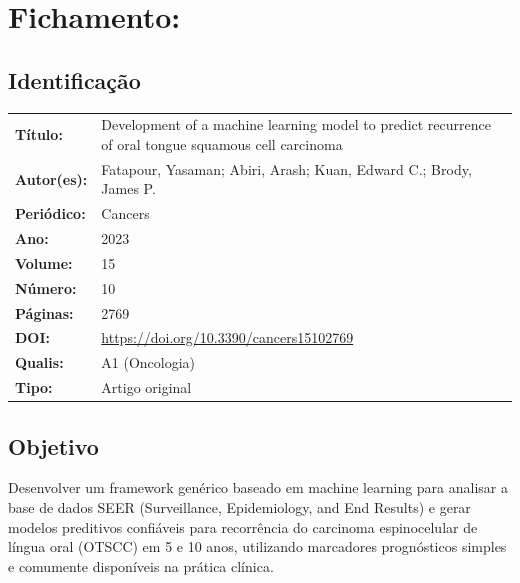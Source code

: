 \section{Fichamento: }

\subsection{Identificação}
\begin{tabular}{ll}
\textbf{Título:} & Development of a machine learning model to predict
recurrence of oral tongue squamous cell carcinoma \\
\textbf{Autor(es):} & Fatapour, Yasaman; Abiri, Arash; Kuan, Edward C.;
Brody, James P. \\
\textbf{Periódico:} & Cancers \\
\textbf{Ano:} & 2023 \\
\textbf{Volume:} & 15 \\
\textbf{Número:} & 10 \\
\textbf{Páginas:} & 2769 \\
\textbf{DOI:} & \url{https://doi.org/10.3390/cancers15102769} \\
\textbf{Qualis:} & A1 (Oncologia) \\
\textbf{Tipo:} & Artigo original \\
\end{tabular}

\subsection{Objetivo}
Desenvolver um framework genérico baseado em machine learning para analisar
a base de dados SEER (Surveillance, Epidemiology, and End Results) e gerar
modelos preditivos confiáveis para recorrência do carcinoma espinocelular
de língua oral (OTSCC) em 5 e 10 anos, utilizando marcadores prognósticos
simples e comumente disponíveis na prática clínica.

